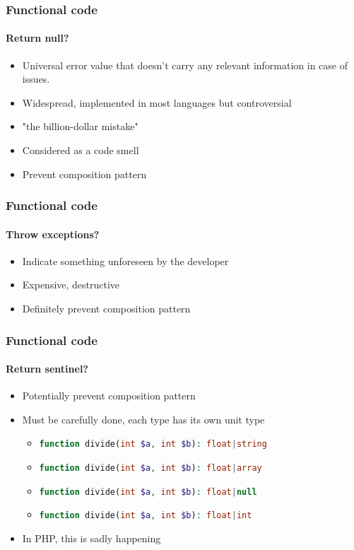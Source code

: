 \begin{frame}
    \frametitle{Functional code}
    \framesubtitle{Return null?}
    \begin{itemize}[<+->]
        \item Universal error value that doesn't carry any relevant information
            in case of issues.
        \item Widespread, implemented in most languages but controversial
        \item "the billion-dollar mistake"
        \item Considered as a code smell
        \item Prevent composition pattern
    \end{itemize}
\end{frame}

\begin{frame}
    \frametitle{Functional code}
    \framesubtitle{Throw exceptions?}
    \begin{itemize}[<+->]
        \item Indicate something unforeseen by the developer
        \item Expensive, destructive
        \item Definitely prevent composition pattern
    \end{itemize}
\end{frame}

\begin{frame}
    \frametitle{Functional code}
    \framesubtitle{Return sentinel?}
    \begin{itemize}[<+->]
        \item Potentially prevent composition pattern
        \item Must be carefully done, each type has its own unit type
        \begin{itemize}[<+->]
            \item \lstinline[language=PHP]!function divide(int $a, int $b): float|string!
            \item \lstinline[language=PHP]!function divide(int $a, int $b): float|array!
            \item \lstinline[language=PHP]!function divide(int $a, int $b): float|null!
            \item \lstinline[language=PHP]!function divide(int $a, int $b): float|int!
        \end{itemize}
        \item In PHP, this is sadly happening
    \end{itemize}
\end{frame}

